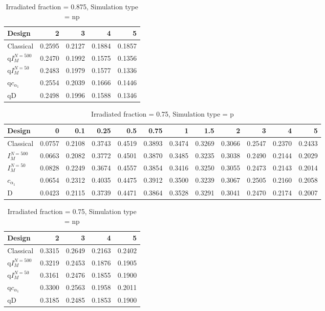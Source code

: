 \documentclass[a4paper]{article}
\begin{document}
\begin{table}[ht]
\centering
\begin{tabular}{lrrrr}
  \hline
Design & 2 & 3 & 4 & 5 \\ 
  \hline
Classical & 0.2595 & 0.2127 & 0.1884 & 0.1857 \\ 
  q$I_M^{N=500}$ & 0.2470 & 0.1992 & 0.1575 & 0.1356 \\ 
  q$I_M^{N=50}$ & 0.2483 & 0.1979 & 0.1577 & 0.1336 \\ 
  q$c_{\alpha_1}$ & 0.2554 & 0.2039 & 0.1666 & 0.1446 \\ 
  qD & 0.2498 & 0.1996 & 0.1588 & 0.1346 \\ 
   \hline
\end{tabular}
\caption{Irradiated fraction = 0.875, Simulation type = np} 
\end{table}

\newpage

\begin{table}[ht]
\centering
\begin{tabular}{lrrrrrrrrrrr}
  \hline
Design & 0 & 0.1 & 0.25 & 0.5 & 0.75 & 1 & 1.5 & 2 & 3 & 4 & 5 \\ 
  \hline
Classical & 0.0757 & 0.2108 & 0.3743 & 0.4519 & 0.3893 & 0.3474 & 0.3269 & 0.3066 & 0.2547 & 0.2370 & 0.2433 \\ 
  $I_M^{N=500}$ & 0.0663 & 0.2082 & 0.3772 & 0.4501 & 0.3870 & 0.3485 & 0.3235 & 0.3038 & 0.2490 & 0.2144 & 0.2029 \\ 
  $I_M^{N=50}$ & 0.0828 & 0.2249 & 0.3674 & 0.4557 & 0.3854 & 0.3416 & 0.3250 & 0.3055 & 0.2473 & 0.2143 & 0.2014 \\ 
  $c_{\alpha_1}$ & 0.0654 & 0.2312 & 0.4035 & 0.4475 & 0.3912 & 0.3500 & 0.3239 & 0.3067 & 0.2505 & 0.2160 & 0.2058 \\ 
  D & 0.0423 & 0.2115 & 0.3739 & 0.4471 & 0.3864 & 0.3528 & 0.3291 & 0.3041 & 0.2470 & 0.2174 & 0.2007 \\ 
   \hline
\end{tabular}
\caption{Irradiated fraction = 0.75, Simulation type = p} 
\end{table}

\begin{table}[ht]
\centering
\begin{tabular}{lrrrr}
  \hline
Design & 2 & 3 & 4 & 5 \\ 
  \hline
Classical & 0.3315 & 0.2649 & 0.2163 & 0.2402 \\ 
  q$I_M^{N=500}$ & 0.3219 & 0.2453 & 0.1876 & 0.1905 \\ 
  q$I_M^{N=50}$ & 0.3161 & 0.2476 & 0.1855 & 0.1900 \\ 
  q$c_{\alpha_1}$ & 0.3300 & 0.2563 & 0.1958 & 0.2011 \\ 
  qD & 0.3185 & 0.2485 & 0.1853 & 0.1900 \\ 
   \hline
\end{tabular}
\caption{Irradiated fraction = 0.75, Simulation type = np} 
\end{table}
\end{document}
